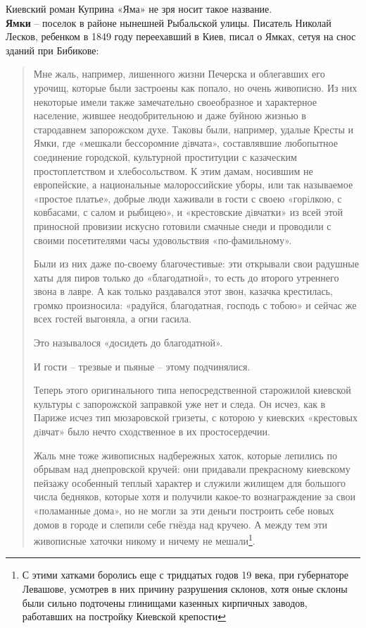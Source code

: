 Киевский роман Куприна «Яма» не зря носит такое название.\\

\textbf{Ямки} – поселок в районе нынешней Рыбальской улицы. Писатель Николай Лесков, ребенком в 1849 году переехавший в Киев, писал о Ямках, сетуя на снос зданий при Бибикове:

\begin{quotation}
Мне жаль, например, лишенного жизни Печерска и облегавших его урочищ, которые были застроены  как попало, но очень живописно. Из них некоторые  имели также замечательно своеобразное и характерное  население, жившее неодобрительною  и даже буйною жизнью в стародавнем  запорожском  духе. Таковы были, например, удалые Кресты и Ямки, где «мешкали бессоромние дiвчата», составлявшие любопытное соединение городской, культурной проституции с казаческим простоплетством и хлебосольством. К этим дамам,  носившим не европейские, а национальные малороссийские уборы, или так называемое  «простое  платье», добрые люди хаживали в гости с  своею «горiлкою, с ковбасами, с салом и рыбицею», и «крестовские дiвчатки» из всей этой приносной провизии искусно готовили смачные снеди и  проводили с своими посетителями часы удовольствия «по-фамильному». 

Были из них даже по-своему благочестивые: эти открывали свои радушные хаты для пиров только до «благодатной», то есть до второго утреннего звона в лавре. А как только раздавался этот звон, казачка  крестилась, громко произносила: «радуйся, благодатная, господь с тобою» и сейчас же всех гостей выгоняла, а огни гасила. 

Это называлося «досидеть до благодатной».

И гости – трезвые и пьяные – этому подчинялися. 

Теперь этого оригинального типа непосредственной старожилой киевской культуры с запорожской  заправкой уже нет и следа. Он исчез, как в Париже исчез тип мюзаровской гризеты, с которою у киевских «крестовых дiвчат» было нечто сходственное в их простосердечии. 

Жаль мне тоже живописных надбережных хаток, которые лепились по обрывам над днепровской   кручей:  они  придавали  прекрасному  киевскому  пейзажу особенный  теплый  характер  и  служили жилищем для большого числа бедняков, которые  хотя  и получили какое-то вознаграждение за свои «поламанные дома», но не могли за эти деньги построить себе новых домов в городе и слепили себе гнёзда  над  кручею.  А  между тем эти живописные хаточки никому и ничему не мешали\footnote{С этими хатками боролись еще с тридцатых годов 19 века, при губернаторе Левашове, усмотрев в них причину разрушения склонов, хотя оные склоны были сильно подточены глинищами казенных кирпичных заводов, работавших на постройку Киевской крепости}.
\end{quotation}


